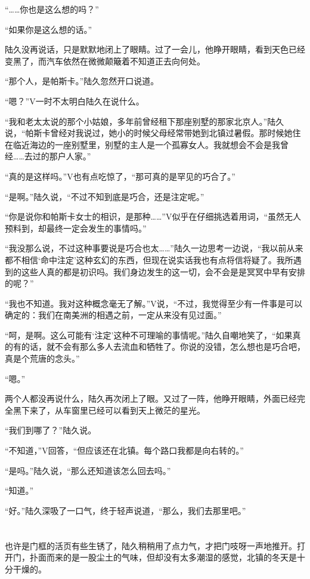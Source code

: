 “……你也是这么想的吗？”

“如果你是这么想的话。”

陆久没再说话，只是默默地闭上了眼睛。过了一会儿，他睁开眼睛，看到天色已经变黑了，而汽车依然在微微颠簸着不知道正去向何处。

“那个人，是帕斯卡。”陆久忽然开口说道。

“嗯？”V一时不太明白陆久在说什么。

“我和老太太说的那个小姑娘，多年前曾经租下那座别墅的那家北京人。”陆久说，“帕斯卡曾经对我说过，她小的时候父母经常带她到北镇过暑假。那时候她住在临近海边的一座别墅里，别墅的主人是一个孤寡女人。我就想会不会是我曾经……去过的那户人家。”

“真的是这样吗。”V也有点吃惊了，“那可真的是罕见的巧合了。”

“是啊。”陆久说，“不过不知到底是巧合，还是注定呢。”

“你是说你和帕斯卡女士的相识，是那种……”V似乎在仔细挑选着用词，“虽然无人预料到，却最终一定会发生的事情吗。”

“我没那么说，不过这种事要说是巧合也太……”陆久一边思考一边说，“我以前从来都不相信‘命中注定’这种玄幻的东西，但现在说实话我也有点将信将疑了。我所遇到的这些人真的都是初识吗。我们身边发生的这一切，会不会是是冥冥中早有安排的呢？”

“我也不知道。我对这种概念毫无了解。”V说，“不过，我觉得至少有一件事是可以确定的：我们在南美洲的相遇之前，一定从来没有见过面。”

“呵，是啊。这么可能有‘注定’这种不可理喻的事情呢。”陆久自嘲地笑了，“如果真的有的话，就不会有那么多人去流血和牺牲了。你说的没错，怎么想也是巧合吧，真是个荒唐的念头。”

“嗯。”

两个人都没再说什么，陆久再次闭上了眼。又过了一阵，他睁开眼睛，外面已经完全黑下来了，从车窗里已经可以看到天上微茫的星光。

“我们到哪了？”陆久说。

“不知道，”V回答，“但应该还在北镇。每个路口我都是向右转的。”

“是吗。”陆久说，“那么还知道该怎么回去吗。”

“知道。”

“好。”陆久深吸了一口气，终于轻声说道，“那么，我们去那里吧。”

\section*{}

也许是门框的活页有些生锈了，陆久稍稍用了点力气，才把门吱呀一声地推开。打开门，扑面而来的是一股尘土的气味，但却没有太多潮湿的感觉，北镇的冬天是十分干燥的。

